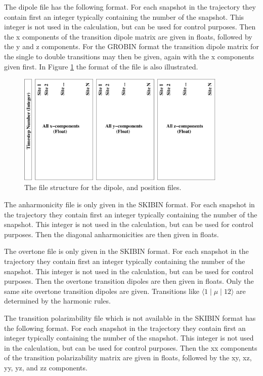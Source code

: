 The dipole file has the following format.
For each snapshot in the trajectory they contain first an integer typically containing the number of the snapshot. This integer is not used in the calculation, but can be used for control purposes.
Then the x components of the transition dipole matrix are given in floats, followed by the y and z components. For the GROBIN format the transition dipole matrix for the single to double transitions may then be given, again with the x components given first. In Figure \ref{fig:filestructure} the format of the file is also illustrated.
\begin{figure}[h!]
\begin{center}
\includegraphics[width=10cm]{file_structure.pdf}
\end{center}
\caption{\label{fig:filestructure}The file structure for the dipole, and position files.}
\end{figure}

The anharmonicity file is only given in the SKIBIN format.
For each snapshot in the trajectory they contain first an integer typically containing the number of the snapshot. This integer is not used in the calculation, but can be used for control purposes.
Then the diagonal anharmonicities are then given in floats.

The overtone file is only given in the SKIBIN format.
For each snapshot in the trajectory they contain first an integer typically containing the number of the snapshot. This integer is not used in the calculation, but can be used for control purposes.
Then the overtone transition dipoles are then given in floats. Only the same site overtone transition dipoles are given. Transitions like $\langle 1\mid\mu\mid 12\rangle$ are determined by the harmonic rules.

The transition polarizability file which is not available in the SKIBIN format 
has the following format. For each snapshot in the trajectory they contain first an integer 
typically containing the number of the snapshot. This integer is not used in the calculation, 
but can be used for control purposes. Then the xx components of the transition polarizability
matrix are given in floats, followed by the xy, xz, yy, yz, and zz components. 

